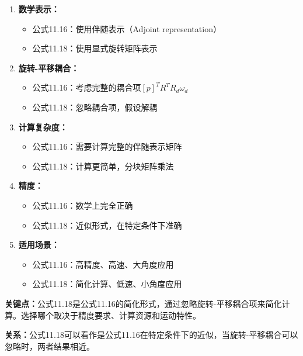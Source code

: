 \documentclass[12pt,a4paper]{article}
\begin{document}
\begin{enumerate}
\item \textbf{数学表示：}
   \begin{itemize}
   \item 公式11.16：使用伴随表示（Adjoint representation）
   \item 公式11.18：使用显式旋转矩阵表示
   \end{itemize}

\item \textbf{旋转-平移耦合：}
   \begin{itemize}
   \item 公式11.16：考虑完整的耦合项$[p]^T R^T R_d \omega_d$
   \item 公式11.18：忽略耦合项，假设解耦
   \end{itemize}

\item \textbf{计算复杂度：}
   \begin{itemize}
   \item 公式11.16：需要计算完整的伴随表示矩阵
   \item 公式11.18：计算更简单，分块矩阵乘法
   \end{itemize}

\item \textbf{精度：}
   \begin{itemize}
   \item 公式11.16：数学上完全正确
   \item 公式11.18：近似形式，在特定条件下准确
   \end{itemize}

\item \textbf{适用场景：}
   \begin{itemize}
   \item 公式11.16：高精度、高速、大角度应用
   \item 公式11.18：简化计算、低速、小角度应用
   \end{itemize}
\end{enumerate}

\textbf{关键点：}公式11.18是公式11.16的简化形式，通过忽略旋转-平移耦合项来简化计算。选择哪个取决于精度要求、计算资源和运动特性。

\textbf{关系：}公式11.18可以看作是公式11.16在特定条件下的近似，当旋转-平移耦合可以忽略时，两者结果相近。
\end{document}
